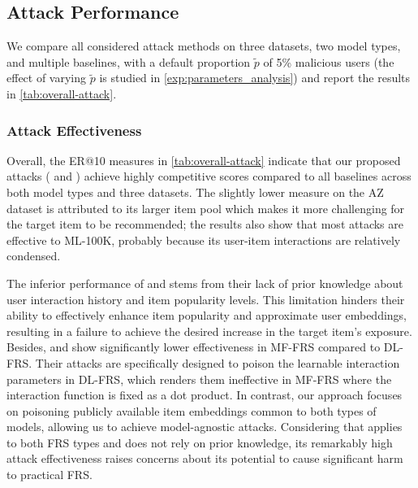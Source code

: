 \subsection{Attack Performance}
We compare all considered attack methods on three datasets, two model types, and multiple baselines, with a default proportion $\tilde{p}$ of 5\% malicious users (the effect of varying $\tilde{p}$ is studied in \cref{exp:parameters_analysis}) and report the results in \cref{tab:overall-attack}.

\subsubsection{Attack Effectiveness}
\label{ssec:attack_effectiveness_comparison}
Overall, the ER@10 measures in \cref{tab:overall-attack} indicate that our proposed attacks (\modelI{} and \modelII{}) achieve highly competitive scores compared to all baselines across both model types and three datasets. 
The slightly lower measure on the AZ dataset is attributed to its larger item pool 
which makes it more challenging for the target item to be recommended; the results also show that most attacks are effective to ML-100K, probably because its user-item interactions are relatively condensed.

The inferior performance of \PIP{} and \FRA{} stems from their lack of prior knowledge about user interaction history and item popularity levels. This limitation hinders their ability to effectively enhance item popularity and approximate user embeddings, resulting in a failure to achieve the desired increase in the target item's exposure.
Besides, \ARA{} and \AHUM{} show significantly lower effectiveness in MF-FRS compared to DL-FRS. Their attacks are specifically designed to poison the learnable interaction parameters in DL-FRS, which renders them ineffective in MF-FRS where the interaction function is fixed as a dot product.
In contrast, our approach focuses on poisoning publicly available item embeddings common to both types of models, allowing us to achieve model-agnostic attacks.
Considering that \model{} applies to both FRS types and does not rely on prior knowledge, its remarkably high attack effectiveness raises concerns about its potential to cause significant harm to practical FRS.


